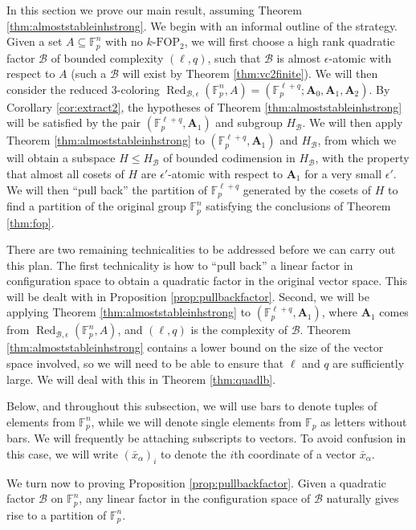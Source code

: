 \documentclass[12pt,oneside,british,a4wide]{amsart}
\numberwithin{equation}{section}
\theoremstyle{definition}
\def\F{\mathbb{F}}
\def\FOP{\mathrm{FOP}}
\def\e{\epsilon}
\newcommand{\xbar}{\bar{x}}
\newcommand{\calB}{\mathcal{B}}
\newcommand{\Red}{{\mathrm{Red}}}
\def\Red{\operatorname{Red}}
\begin{document}
In this section we prove our main result, assuming Theorem \ref{thm:almoststableinhstrong}. We begin with an informal outline of the strategy.   Given a set $A\subseteq \F_p^n$ with no $k$-$\FOP_2$, we will first choose a high rank quadratic factor $\calB$ of bounded complexity $(\ell,q)$, such that $\calB$ is almost $\e$-atomic with respect to $A$ (such a $\calB$ will exist by Theorem \ref{thm:vc2finite}).  We will then consider the reduced $3$-coloring $\Red_{\calB,\e}(\F_p^n,A)= (\F_p^{\ell+q};\mathbf{A}_0,\mathbf{A}_1,\mathbf{A}_2)$.  By Corollary \ref{cor:extract2}, the hypotheses of Theorem \ref{thm:almoststableinhstrong} will be satisfied by the pair $(\F_p^{\ell+q},\mathbf{A}_1)$ and subgroup $H_{\calB}$.  We will then apply Theorem \ref{thm:almoststableinhstrong} to $(\F_p^{\ell+q},\mathbf{A}_1)$ and  $H_{\calB}$, from which we will obtain a subspace $H\leqslant H_{\calB}$ of bounded codimension in $H_{\calB}$, with the property that almost all cosets of $H$ are $\e'$-atomic with respect to $\mathbf{A}_1$ for a very small $\e'$.  We will then ``pull back'' the partition of $\F_p^{\ell+q}$ generated by the cosets of $H$ to find a partition of the original group $\F_p^n$ satisfying the conclusions of Theorem \ref{thm:fop}.  


 There are two remaining technicalities to be addressed before we can carry out this plan.  The first technicality is how to ``pull  back'' a linear factor in configuration space to obtain a quadratic factor in the original vector space.   This will be dealt with in Proposition \ref{prop:pullbackfactor}.  Second, we will be applying Theorem \ref{thm:almoststableinhstrong} to $(\F_p^{\ell+q},\mathbf{A}_1)$, where $\mathbf{A}_1$ comes from $\Red_{\calB,\e}(\F_p^n,A)$, and $(\ell,q)$ is the complexity of $\calB$.  Theorem \ref{thm:almoststableinhstrong} contains a lower bound on the size of the vector space involved, so we will need to be able to ensure that $\ell$ and $q$ are sufficiently large.  We will deal with this  in Theorem \ref{thm:quadlb}.   
 
Below, and throughout this subsection, we will use bars to denote tuples of elements from $\F_p^n$,  while we will   denote single elements from $\F_p$ as letters without bars. We will frequently be attaching subscripts to vectors.  To avoid confusion in this case, we will write $(\xbar_{\alpha})_i$ to denote the $i$th coordinate of a  vector $\xbar_{\alpha}$.
 
  We turn now to proving Proposition \ref{prop:pullbackfactor}. Given a quadratic factor $\calB$ on $\F_p^n$, any linear factor in the configuration space of $\calB$ naturally gives rise to a partition of $\F_p^n$.  
 
\end{document}
